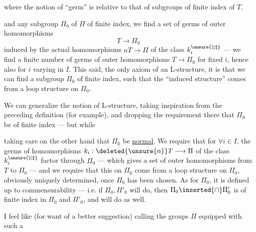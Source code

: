 where the notion of ``germ'' is relative to that of subgroups of finite index of $T$.  


and any subgroup  $\Pi_0$ of $\Pi$ of finite index, we find  a set of germs of outer homomorphisms
\[
T\longrightarrow\Pi_0
\]
induced by the actual homomorphisms  $nT\longrightarrow\Pi$ of the class $k_i^{\unsure{\natural|\sharp}}$ --- we find a finite number of germs of outer homomorphisms $T\longrightarrow\Pi_0$ for fixed $i$, hence also for $i$ varying in $I$. This said, the only axiom of an L-structure, it is that we can find a subgroup $\Pi_0$ of finite index, such that the ``induced structure'' comes from a loop structure on $\Pi_0$.

We can generalize the notion of L-structure, taking inspiration from the preceding definition (for example), and dropping the requirement there that $\Pi_0$ be of finite index --- but while


taking care on the other hand that $\Pi_0$ be \uline{normal}. We require that  for $\forall i\in I$, the germs of homomorphisms $k_i:\deleted{\unsure{n}}T\longrightarrow\Pi$ of the class $k_i^{\unsure{\natural|\sharp}}$ factor through $\Pi_0$ --- which gives a set of outer homomorphisms from $T$ to $\Pi_0$ ---
and we require that this   on $\Pi_0$ come  from a loop structure on $\Pi_0$, \unsure{$\xi$|\&} obviously uniquely determined, once $\Pi_0$ has been chosen. As for $\Pi_0$, it is defined up to commensurability --- i.e. if $\Pi_0,\Pi'_0$ will do, then $\Pi_0\inserted{\cap}\Pi'_0$ is of finite index in $\Pi_0$ and $\Pi'_0$, and will do as well.

 I feel like (for want of a better suggestion) calling the groups $\Pi$ equipped with such a